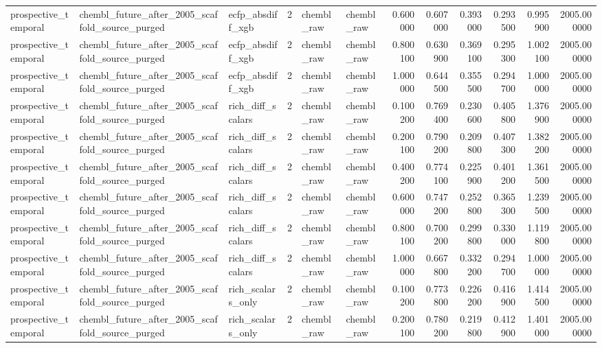 \begin{longtable}{lllrllrrrrrr}
prospective\_temporal & chembl\_future\_after\_2005\_scaffold\_source\_purged & ecfp\_absdiff\_xgb & 2 & chembl\_raw & chembl\_raw & 0.600000 & 0.607000 & 0.393000 & 0.293500 & 0.995900 & 2005.000000 \\
prospective\_temporal & chembl\_future\_after\_2005\_scaffold\_source\_purged & ecfp\_absdiff\_xgb & 2 & chembl\_raw & chembl\_raw & 0.800100 & 0.630900 & 0.369100 & 0.295300 & 1.002100 & 2005.000000 \\
prospective\_temporal & chembl\_future\_after\_2005\_scaffold\_source\_purged & ecfp\_absdiff\_xgb & 2 & chembl\_raw & chembl\_raw & 1.000000 & 0.644500 & 0.355500 & 0.294700 & 1.000000 & 2005.000000 \\
prospective\_temporal & chembl\_future\_after\_2005\_scaffold\_source\_purged & rich\_diff\_scalars & 2 & chembl\_raw & chembl\_raw & 0.100200 & 0.769400 & 0.230600 & 0.405800 & 1.376900 & 2005.000000 \\
prospective\_temporal & chembl\_future\_after\_2005\_scaffold\_source\_purged & rich\_diff\_scalars & 2 & chembl\_raw & chembl\_raw & 0.200100 & 0.790200 & 0.209800 & 0.407300 & 1.382200 & 2005.000000 \\
prospective\_temporal & chembl\_future\_after\_2005\_scaffold\_source\_purged & rich\_diff\_scalars & 2 & chembl\_raw & chembl\_raw & 0.400200 & 0.774100 & 0.225900 & 0.401200 & 1.361500 & 2005.000000 \\
prospective\_temporal & chembl\_future\_after\_2005\_scaffold\_source\_purged & rich\_diff\_scalars & 2 & chembl\_raw & chembl\_raw & 0.600000 & 0.747200 & 0.252800 & 0.365300 & 1.239500 & 2005.000000 \\
prospective\_temporal & chembl\_future\_after\_2005\_scaffold\_source\_purged & rich\_diff\_scalars & 2 & chembl\_raw & chembl\_raw & 0.800100 & 0.700200 & 0.299800 & 0.330000 & 1.119800 & 2005.000000 \\
prospective\_temporal & chembl\_future\_after\_2005\_scaffold\_source\_purged & rich\_diff\_scalars & 2 & chembl\_raw & chembl\_raw & 1.000000 & 0.667800 & 0.332200 & 0.294700 & 1.000000 & 2005.000000 \\
prospective\_temporal & chembl\_future\_after\_2005\_scaffold\_source\_purged & rich\_scalars\_only & 2 & chembl\_raw & chembl\_raw & 0.100200 & 0.773800 & 0.226200 & 0.416900 & 1.414500 & 2005.000000 \\
prospective\_temporal & chembl\_future\_after\_2005\_scaffold\_source\_purged & rich\_scalars\_only & 2 & chembl\_raw & chembl\_raw & 0.200100 & 0.780200 & 0.219800 & 0.412900 & 1.401000 & 2005.000000 \\

\end{longtable}
